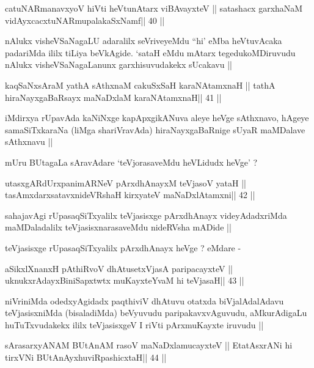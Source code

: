 \begin{shl}
catuNARmanavxyoV hiVti heVtunA\s tarx viBAvayxteV ||
satashacx garxhaNaM vidAyxcacxtuNARmupalakaSxNamf\hfill || 40 ||
\end{shl}

\begin{artha}
nAlukx visheVSaNagaLU adaralilx seVriveyeMdu ``hi' eMba heVtuvAcaka
padariMda ililx tiLiya beVkAgide. `sataH eMdu mAtarx tegedukoMDiruvudu
nAlukx visheVSaNagaLanunx garxhisuvudakekx sUcakavu ||
\end{artha}

\begin{shl}
kaqSaNxsAraM yathA sAthxnaM cakuSxSaH karaNAtamxnaH ||
tathA hiraNayxgaBaRsayx maNaDxlaM karaNAtamxnaH\hfill || 41 ||
\end{shl}

\begin{artha}
iMdirxya rUpavAda kaNiNxge kapApxgikANuva aleye heVge sAthxnavo,
hAgeye samaSiTxkaraNa (liMga shariVravAda) hiraNayxgaBaRnige sUyaR
maMDalave sAthxnavu ||

mUru BUtagaLa sAravAdare `teVjorasaveMdu heVLidudx heVge' ?
\end{artha}

\begin{shl}
utasxgARdUrxpanimARNeV pArxdhAnayxM teVjasoV yataH ||
tasAmxdarxsatavxnideVRshaH kirxyateV maNaDxlAtamxni\hfill || 42 ||
\end{shl}

\begin{artha}
sahajavAgi rUpasaqSiTxyalilx teVjasisxge pArxdhAnayx videyAdadxriMda
maMDaladalilx teVjasisxnarasaveMdu nideRVsha mADide ||

teVjasisxge rUpasaqSiTxyalilx pArxdhAnayx heVge ? eMdare -
\end{artha}

\begin{shl}
aSikxlXnanxH pAthiRvoV dhAtusetxVjasA paripacayxteV ||
uknukxrAdayxBiniSapxtwtx muKayxteYvaM hi teVjasaH\hfill || 43 ||
\end{shl}

\begin{artha}
niVriniMda odedxyAgidadx paqthiviV dhAtuvu otatxda biVjalAdalAdavu
teVjasisxniMda (bisaladiMda) beVyuvudu paripakavxvAguvudu,
aMkurAdigaLu huTuTxvudakekx ililx teVjasisxgeV I riVti pArxmuKayxte
iruvudu ||
\end{artha}

\begin{shl}
sArasarxyANAM BUtAnAM rasoV maNaDxlamucayxteV ||
EtatAsxrANi hi tirxVNi BUtAnAyxhuviRpashicxtaH\hfill || 44 ||
\end{shl}

